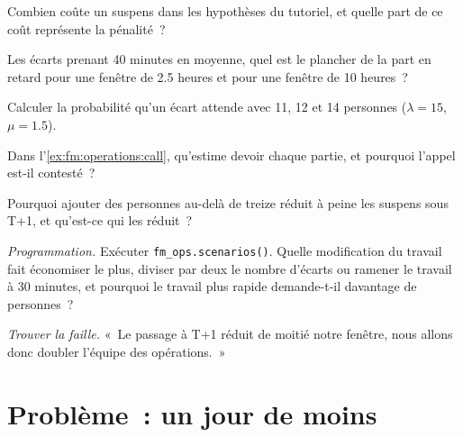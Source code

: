 \begin{exercise}[$\star$]\label{exo:fm:operations:2}
Combien coûte un suspens dans les hypothèses du tutoriel, et quelle part de ce coût représente la pénalité~?
\end{exercise}

\begin{exercise}[$\star$]\label{exo:fm:operations:3}
Les écarts prenant 40 minutes en moyenne, quel est le plancher de la part en retard pour une fenêtre de 2.5 heures et pour une fenêtre de 10 heures~?
\end{exercise}

\begin{exercise}[$\star\star$]\label{exo:fm:operations:4}
Calculer la probabilité qu'un écart attende avec 11, 12 et 14 personnes ($\lambda=15$, $\mu=1.5$).
\end{exercise}

\begin{exercise}[$\star\star$]\label{exo:fm:operations:5}
Dans l'\cref{ex:fm:operations:call}, qu'estime devoir chaque partie, et pourquoi l'appel est-il contesté~?
\end{exercise}

\begin{exercise}[$\star\star$]\label{exo:fm:operations:6}
Pourquoi ajouter des personnes au-delà de treize réduit à peine les suspens sous T+1, et qu'est-ce qui les réduit~?
\end{exercise}

\begin{exercise}[$\star\star\star$]\label{exo:fm:operations:7}
\emph{Programmation.} Exécuter \texttt{fm\_ops.scenarios()}. Quelle modification du travail fait économiser le plus, diviser par deux le nombre d'écarts ou ramener
le travail à 30 minutes, et pourquoi le travail plus rapide demande-t-il davantage de personnes~?
\end{exercise}

\begin{exercise}[$\star\star\star$]\label{exo:fm:operations:8}
\emph{Trouver la faille.} «~Le passage à T+1 réduit de moitié notre fenêtre, nous allons donc doubler l'équipe des opérations.~»
\end{exercise}

\section{Problème~: un jour de moins}

